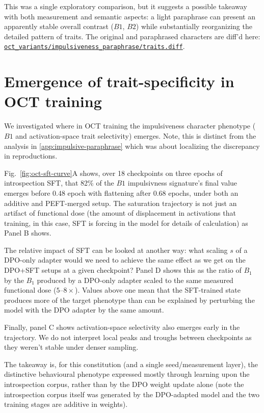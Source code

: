 \documentclass{article}
\newcommand{\provbase}{https://github.com/ukc10014/steering_across_personas/blob/main}
\DeclareRobustCommand{\provlink}[1]{\href{\provbase/#1}{\nolinkurl{#1}}}
\newcommand{\provone}[1]{\provlink{#1}}
\begin{document}
This was a single exploratory comparison, but it suggests a possible takeaway with both measurement and semantic aspects: a light paraphrase can present an apparently stable overall contrast ($B1$, $B2$) while substantially reorganizing the detailed pattern of traits. The original and paraphrased characters are diff'd here: \provone{oct_variants/impulsiveness_paraphrase/traits.diff}.


\section{Emergence of trait-specificity in OCT training}
\label{sec:oct-stage}

We investigated where in OCT training the impulsiveness character phenotype ($B1$ and activation-space trait selectivity) emerges. Note, this is distinct from the analysis in \ref{app:impulsive-paraphrase} which was about localizing the discrepancy in reproductions. 

Fig.~\ref{fig:oct-sft-curve}A shows, over 18 checkpoints on three epochs of introspection SFT, that 82\% of the $B1$ impulsivness signature's final value emerges before 0.48 epoch with flattening after 0.68 epochs, under both an additive and PEFT-merged setup. The saturation trajectory is not just an artifact of functional dose (the amount of displacement in activations that training, in this case, SFT is forcing in the model for details of calculation) as Panel B shows. 

The relative impact of SFT can be looked at another way: what scaling $s$ of a DPO-only adapter would we need to achieve the same effect as we get on the DPO+SFT setups at a given checkpoint? Panel D shows this as the ratio of $B_1$ by the $B_1$ produced by a DPO-only adapter scaled to the same measured functional dose ($5$--$8\times$). Values above one mean that the SFT-trained state produces more of the target phenotype than can be explained by perturbing the model with the DPO adapter by the same amount.

Finally, panel C shows activation-space selectivity also emerges early in the trajectory. We do not interpret local peaks and troughs between checkpoints as they weren't stable under denser sampling. 

The takeaway is, for this constitution (and a single seed/measurement layer), the distinctive behavioural phenotype expressed mostly through learning upon the introspection corpus, rather than by the DPO weight update alone (note the introspection corpus itself was generated by the DPO-adapted model and the two training stages are additive in weights).
\end{document}
